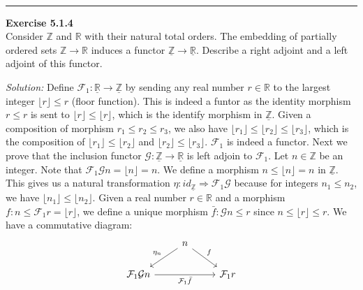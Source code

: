 \documentclass[a4paper, 12pt]{article}
\newenvironment{problem}[2][Exercise]
    { \begin{mdframed}[backgroundcolor=gray!20] \textbf{#1 #2} \\}
    {  \end{mdframed}}
\newenvironment{solution}
    {\textit{Solution:}}
    {}
\begin{document}
\\ 
\noindent\rule{7in}{2.8pt}
\begin{problem}{5.1.4}
Consider \(\mathbb{Z}\) and \(\mathbb{R}\) with their natural total orders. The embedding of partially ordered sets \(\mathbb{Z}\rightarrow \mathbb{R}\) induces a functor \(\underline{\mathbb{Z}}\rightarrow \underline{\mathbb{R}}\). 
Describe a right adjoint and a left adjoint of this functor.
\end{problem}
\begin{solution}
Define \(\mathcal{F}_1:\underline{\mathbb{R}}\rightarrow \underline{\mathbb{Z}}\) by sending any real number \(r\in \mathbb{R}\) to the largest integer \(\lfloor r \rfloor\leq r\) (floor function). This is indeed a funtor as the identity morphism \(r\leq r\) 
is sent to \(\lfloor r\rfloor \leq \lfloor r\rfloor\), which is the identify morphism in \(\underline{\mathbb{Z}}\). Given a composition of morphism \(r_1\leq r_2\leq r_3\), we also have \(\lfloor r_1\rfloor \leq \lfloor r_2\rfloor \leq \lfloor r_3\rfloor\), which is the composition of 
\(\lfloor r_1\rfloor \leq \lfloor r_2\rfloor\) and \(\lfloor r_2\rfloor\leq \lfloor r_3\rfloor\). \(\mathcal{F}_1\) is indeed a functor. Next we prove that the inclusion functor \(\mathcal{G}:\underline{\mathbb{Z}}\rightarrow \underline{\mathbb{R}}\) is left adjoin to \(\mathcal{F}_1\). Let \(n\in \mathbb{Z}\) 
be an integer. Note that \(\mathcal{F}_1 \mathcal{G}n=\lfloor n\rfloor=n\). We define a morphism \(n\leq \lfloor n\rfloor=n\) in \(\underline{\mathbb{Z}}\). This gives us a natural transformation \(\eta: id_{\underline{\mathbb{Z}}}\Rightarrow \mathcal{F}_1 \mathcal{G}\) because for integers \(n_1\leq n_2\), we have \(\lfloor n_1\rfloor\leq \lfloor n_2\rfloor\). Given a real number \(r\in \mathbb{R}\) 
and a morphism \(f:n\leq \mathcal{F}_1r=\lfloor r\rfloor\), we define a unique morphism \(\bar{f}:\mathcal{G}n\leq r\) since \(n\leq \lfloor r\rfloor \leq r\). We have a commutative diagram:
\[\begin{tikzcd}
	& n \\
	{\mathcal{F}_1\mathcal{G}n} && {\mathcal{F}_1r}
	\arrow["{\eta_n}"', from=1-2, to=2-1]
	\arrow["f", from=1-2, to=2-3]
	\arrow["{\mathcal{F}_1\bar{f}}"', from=2-1, to=2-3]
\end{tikzcd}\]

\end{solution}
\end{document}
